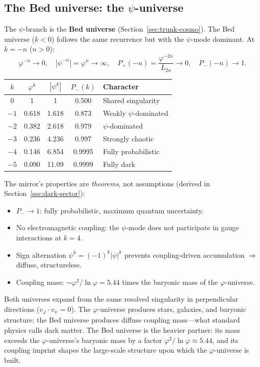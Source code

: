 \documentclass[12pt,a4paper]{article}
\newcommand{\bed}{Bed universe}
\begin{document}
\subsection{The \bed{}: the $\psi$-universe}

The $\psi$-branch is the \textbf{\bed{}} (Section~\ref{sec:trunk-cosmo}). The \bed{} ($k < 0$) follows the same recurrence but with the $\psi$-mode dominant. At $k = -n$ ($n > 0$):
\begin{equation}
\varphi^{-n} \to 0, \quad |\psi^{-n}| = \varphi^n \to \infty, \quad P_+(-n) = \frac{\varphi^{-2n}}{L_{2n}} \to 0, \quad P_-(-n) \to 1.
\end{equation}

\begin{center}
\begin{tabular}{|c|c|c|c|l|}
\hline
$k$ & $\varphi^k$ & $|\psi^k|$ & $P_-(k)$ & Character \\
\hline
$0$ & 1 & 1 & 0.500 & Shared singularity \\
$-1$ & 0.618 & 1.618 & 0.873 & Weakly $\psi$-dominated \\
$-2$ & 0.382 & 2.618 & 0.979 & $\psi$-dominated \\
$-3$ & 0.236 & 4.236 & 0.997 & Strongly chaotic \\
$-4$ & 0.146 & 6.854 & 0.9995 & Fully probabilistic \\
$-5$ & 0.090 & 11.09 & 0.9999 & Fully dark \\
\hline
\end{tabular}
\end{center}

\noindent The mirror's properties are \emph{theorems}, not assumptions (derived in Section~\ref{sec:dark-sector}):
\begin{itemize}
\item $P_- \to 1$: fully probabilistic, maximum quantum uncertainty.
\item No electromagnetic coupling: the $\psi$-mode does not participate in gauge interactions at $k = 4$.
\item Sign alternation $\psi^k = (-1)^k |\psi|^k$ prevents coupling-driven accumulation $\Rightarrow$ diffuse, structureless.
\item Coupling mass: $\sim \varphi^2/\ln\varphi = 5.44$ times the baryonic mass of the $\varphi$-universe.
\end{itemize}

\noindent Both universes expand from the same resolved singularity in perpendicular directions ($v_\varphi \cdot v_\psi = 0$).  The $\varphi$-universe produces stars, galaxies, and baryonic structure; the \bed{} produces diffuse coupling mass---what standard physics calls dark matter.  The \bed{} is the heavier partner: its mass exceeds the $\varphi$-universe's baryonic mass by a factor $\varphi^2/\ln\varphi \approx 5.44$, and its coupling imprint shapes the large-scale structure upon which the $\varphi$-universe is built.
\end{document}
